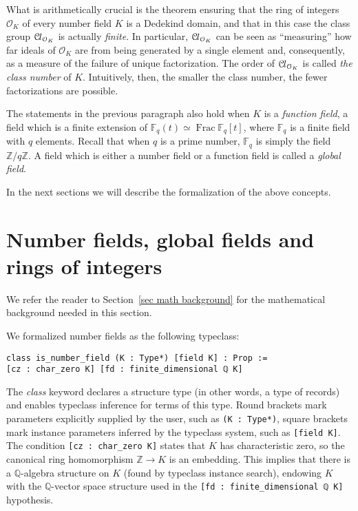 \documentclass[a4paper,USenglish,cleveref, autoref, thm-restate]{lipics-v2021}
\newcommand{\lean}[1]{\texttt{#1}\xspace} %
\newcommand*{\OK}[1][K]{\mathcal{O}_{#1}}
\newcommand*{\Cl}{\mathcal{C}\kern-.075em l}
\newcommand*{\Fq}[1][q]{\mathbb{F}_{#1}}
\newcommand{\Q}{\mathbb{Q}}
\newcommand{\Z}{\mathbb{Z}}
\DeclareMathOperator{\Frac}{Frac}
\begin{document}
What is arithmetically crucial is the theorem ensuring that the ring of integers $\OK$ of every number field $K$ is a Dedekind domain,
and that in this case the class group $\Cl_{\OK}$ is actually \emph{finite}.
In particular, $\Cl_{\OK}$ can be seen as ``measuring'' how far ideals of $\OK$ are from being generated by a single element and,
consequently, as a measure of the failure of unique factorization.
The order of $\Cl_{\OK}$ is called \emph{the class number} of $K$.
Intuitively, then, the smaller the class number, the fewer factorizations are possible.

The statements in the previous paragraph also hold when $K$ is a \emph{function field}, a field which is a finite extension of $\Fq(t) \simeq \Frac \Fq[q][t]$, where $\Fq$ is a finite field with $q$ elements. Recall that when $q$ is a prime number, $\Fq$ is simply the field $\Z/q\Z$.
A field which is either a number field or a function field is called a \emph{global field}.

In the next sections we will describe the formalization of the above concepts.

\section{Number fields, global fields and rings of integers}

We refer the reader to Section~\ref{sec math background} for the mathematical background needed in this section.

We formalized number fields as the following typeclass:
\begin{lstlisting}
class is_number_field (K : Type*) [field K] : Prop :=
[cz : char_zero K] [fd : finite_dimensional ℚ K]
\end{lstlisting}
The \emph{class} keyword declares a structure type (in other words, a type of records) and enables typeclass inference for terms of this type.
Round brackets mark parameters explicitly supplied by the user, such as \lean{(K : Type*)},
square brackets mark instance parameters inferred by the typeclass system, such as \lean{[field K]}. The condition \lean{[cz : char\_zero K]} states that $K$ has characteristic zero, so the canonical ring homomorphism $\Z \to K$ is an embedding.
This implies that there is a $\Q$-algebra structure on $K$ (found by typeclass instance search), endowing $K$ with the $\Q$-vector space structure used in the \mbox{\lean{[fd : finite\_dimensional ℚ K]}} hypothesis.
\end{document}
